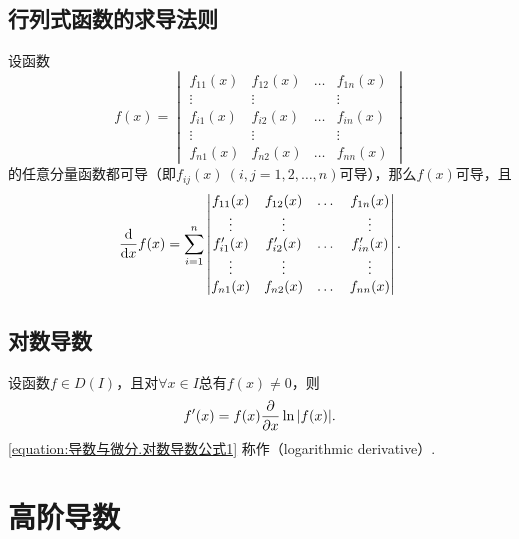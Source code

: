 \subsection{行列式函数的求导法则}
\begin{theorem}
\def\f#1{f_{#1}(x)}%
\def\g#1{f_{#1}'(x)}%
设函数\[
f(x) = \begin{vmatrix}
\f{11} & \f{12} & \dots & \f{1n} \\
\vdots & \vdots & & \vdots \\
\f{i1} & \f{i2} & \dots & \f{in} \\
\vdots & \vdots & & \vdots \\
\f{n1} & \f{n2} & \dots & \f{nn}
\end{vmatrix}
\]的任意分量函数都可导（即\(\f{ij}\ (i,j=1,2,\dotsc,n)\)可导），那么\(f(x)\)可导，且\[
\dv{x} f(x) = \sum\limits_{i=1}^n \begin{vmatrix}
\f{11} & \f{12} & \dots & \f{1n} \\
\vdots & \vdots & & \vdots \\
\g{i1} & \g{i2} & \dots & \g{in} \\
\vdots & \vdots & & \vdots \\
\f{n1} & \f{n2} & \dots & \f{nn}
\end{vmatrix}.
\]
\end{theorem}

\subsection{对数导数}
\begin{theorem}
设函数\(f \in D(I)\)，且对\(\forall x \in I\)总有\(f(x)\neq0\)，则
\begin{equation}\label{equation:导数与微分.对数导数公式1}
f'(x) = f(x) \pdv{x} \ln\abs{f(x)}.
\end{equation}
\rm
\cref{equation:导数与微分.对数导数公式1} 称作（logarithmic derivative）.
\end{theorem}

\section{高阶导数}

